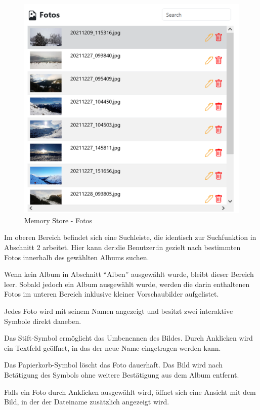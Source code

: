 \begin{figure} [h t]
    \centering
    \includegraphics[scale=0.7]{pics/memory_store_teil3.PNG}
    \caption{Memory Store - Fotos}
    \label{fig:memory-store-fotos}
\end{figure}

Im oberen Bereich befindet sich eine Suchleiste, die identisch zur Suchfunktion in Abschnitt 2 arbeitet. Hier kann der:die Benutzer:in gezielt nach bestimmten Fotos innerhalb des gewählten Albums suchen.

Wenn kein Album in Abschnitt ``Alben'' ausgewählt wurde, bleibt dieser Bereich leer. Sobald jedoch ein Album ausgewählt wurde, werden die darin enthaltenen Fotos im unteren Bereich inklusive kleiner Vorschaubilder aufgelistet.

Jedes Foto wird mit seinem Namen angezeigt und besitzt zwei interaktive Symbole direkt daneben.

Das Stift-Symbol ermöglicht das Umbenennen des Bildes. Durch Anklicken wird ein Textfeld geöffnet, in das der neue Name eingetragen werden kann.

Das Papierkorb-Symbol löscht das Foto dauerhaft. Das Bild wird nach Betätigung des Symbols ohne weitere Bestätigung aus dem Album entfernt.

Falls ein Foto durch Anklicken ausgewählt wird, öffnet sich eine Ansicht mit dem Bild, in der der Dateiname zusätzlich angezeigt wird. 

